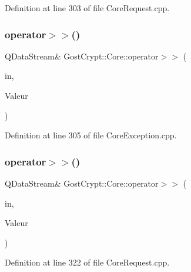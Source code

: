 Definition at line 303 of file Core\+Request.\+cpp.

\mbox{\label{namespace_gost_crypt_1_1_core_a86ad97819ccee7a7033f3b69fd47ae74}} 
\subsubsection{\texorpdfstring{operator$>$$>$()}{operator>>()}\hspace{0.1cm}{\footnotesize\ttfamily [55/56]}}
{\footnotesize\ttfamily Q\+Data\+Stream\& Gost\+Crypt\+::\+Core\+::operator$>$$>$ (\begin{DoxyParamCaption}\item[{Q\+Data\+Stream \&}]{in,  }\item[{\hyperlink{class_gost_crypt_1_1_core_1_1_failed_using_system_random_source}{Gost\+Crypt\+::\+Core\+::\+Failed\+Using\+System\+Random\+Source} \&}]{Valeur }\end{DoxyParamCaption})}



Definition at line 305 of file Core\+Exception.\+cpp.

\mbox{\label{namespace_gost_crypt_1_1_core_ade26869a62f08c4cc4143dfbbe6fa402}} 
\subsubsection{\texorpdfstring{operator$>$$>$()}{operator>>()}\hspace{0.1cm}{\footnotesize\ttfamily [56/56]}}
{\footnotesize\ttfamily Q\+Data\+Stream\& Gost\+Crypt\+::\+Core\+::operator$>$$>$ (\begin{DoxyParamCaption}\item[{Q\+Data\+Stream \&}]{in,  }\item[{\hyperlink{struct_gost_crypt_1_1_core_1_1_benchmark_algorithms_request}{Benchmark\+Algorithms\+Request} \&}]{Valeur }\end{DoxyParamCaption})}



Definition at line 322 of file Core\+Request.\+cpp.

